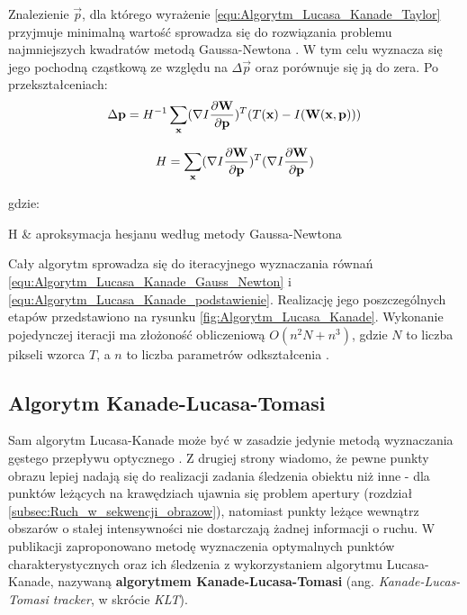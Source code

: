 Znalezienie $\vec{p}$, dla którego wyrażenie \ref{equ:Algorytm_Lucasa_Kanade_Taylor} przyjmuje minimalną wartość sprowadza się do rozwiązania problemu najmniejszych kwadratów metodą Gaussa-Newtona \cite{Baker2004}. W tym celu wyznacza się jego pochodną cząstkową ze względu na $\Delta \vec{p}$ oraz porównuje się ją do zera. Po przekształceniach:
\begin{equation}
\label{equ:Algorytm_Lucasa_Kanade_Gauss_Newton}
	\Delta \mathbf{p} = H^{-1} \sum\limits_{\mathbf{x}}(\nabla I \frac{\partial \mathbf{W}}{\partial \mathbf{p}})^T (T(\mathbf{x}) - I(\mathbf{W}(\mathbf{x}, \mathbf{p})))
\end{equation}

\begin{equation}
\label{equ:Algorytm_Lucasa_Kanade_hesjan}
	H = \sum\limits_{\mathbf{x}}(\nabla I \frac{\partial \mathbf{W}}{\partial \mathbf{p}})^T (\nabla I \frac{\partial \mathbf{W}}{\partial \mathbf{p}})
\end{equation}

\noindent
gdzie:
\begin{conditions}
	H & aproksymacja hesjanu według metody Gaussa-Newtona \\
\end{conditions}

Cały algorytm sprowadza się do iteracyjnego wyznaczania równań \ref{equ:Algorytm_Lucasa_Kanade_Gauss_Newton} i \ref{equ:Algorytm_Lucasa_Kanade_podstawienie}. Realizację jego poszczególnych etapów przedstawiono na rysunku \ref{fig:Algorytm_Lucasa_Kanade}. Wykonanie pojedynczej iteracji ma złożoność obliczeniową $O(n^2 N + n^3)$, gdzie $N$ to liczba pikseli wzorca $T$, a $n$ to liczba parametrów odkształcenia \cite{Baker2004}.

\subsection{Algorytm Kanade-Lucasa-Tomasi}
\label{subsec:Algorytm_Kanade_Lucasa_Tomasi}

Sam algorytm Lucasa-Kanade może być w zasadzie jedynie metodą wyznaczania gęstego przepływu optycznego \cite{Yilmaz2006}. Z drugiej strony wiadomo, że pewne punkty obrazu lepiej nadają się do realizacji zadania śledzenia obiektu niż inne \cite{Tomasi1991} - dla punktów leżących na krawędziach ujawnia się problem apertury (rozdział \ref{subsec:Ruch_w_sekwencji_obrazow}), natomiast 
punkty leżące wewnątrz obszarów o stałej intensywności nie dostarczają żadnej informacji o ruchu. W publikacji \cite{Tomasi1991} zaproponowano metodę wyznaczenia optymalnych punktów charakterystycznych oraz ich śledzenia z wykorzystaniem algorytmu Lucasa-Kanade, nazywaną \textbf{algorytmem Kanade-Lucasa-Tomasi} (ang. \textit{Kanade-Lucas-Tomasi tracker}, w skrócie \textit{KLT}).

